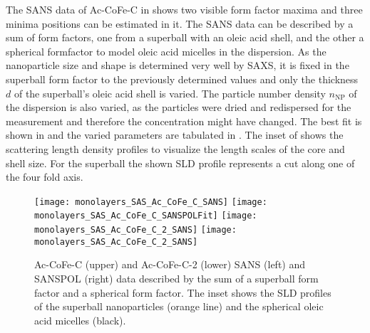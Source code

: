 \documentclass[\main/dresen_thesis.tex]{subfiles}
\begin{document}
      The SANS data of Ac-CoFe-C in  shows two visible form factor maxima and three minima positions can be estimated in it.
      The SANS data can be described by a sum of form factors, one from a superball with an oleic acid shell, and the other a spherical formfactor to model oleic acid micelles in the dispersion.
      As the nanoparticle size and shape is determined very well by SAXS, it is fixed in the superball form factor to the previously determined values and only the thickness $d$ of the superball's oleic acid shell is varied.
      The particle number density $n_\mathrm{NP}$ of the dispersion is also varied, as the particles were dried and redispersed for the measurement and therefore the concentration might have changed.
      The best fit is shown in  and the varied parameters are tabulated in .
      The inset of  shows the scattering length density profiles to visualize the length scales of the core and shell size.
      For the superball the shown SLD profile represents a cut along one of the four fold axis.

      \begin{figure}[tb]
        \centering
        \texttt{[image: monolayers\_SAS\_Ac\_CoFe\_C\_SANS]}
        \texttt{[image: monolayers\_SAS\_Ac\_CoFe\_C\_SANSPOLFit]}
        \texttt{[image: monolayers\_SAS\_Ac\_CoFe\_C\_2\_SANS]}
        \texttt{[image: monolayers\_SAS\_Ac\_CoFe\_C\_2\_SANS]}
        \caption{\label{fig:monolayers:nanoparticle:sans:superballOAFit}Ac-CoFe-C (upper) and Ac-CoFe-C-2 (lower) SANS (left) and SANSPOL (right) data described by the sum of a superball form factor and a spherical form factor. The inset shows the SLD profiles of the superball nanoparticles (orange line) and the spherical oleic acid micelles (black).}
      \end{figure}
\end{document}
